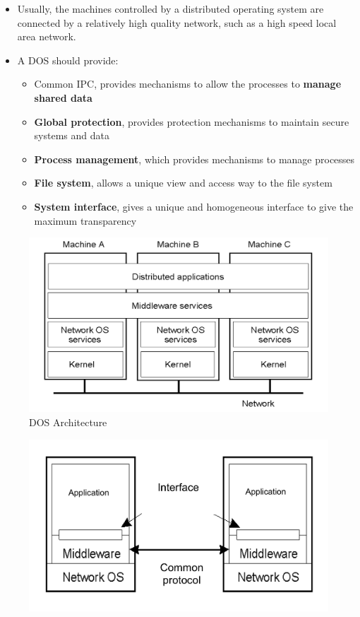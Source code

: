 \begin{itemize}
\begin{itemize}
        \item Usually, the machines controlled by a distributed operating system are connected by a relatively high quality network, such as a high speed local area network.
        \item A DOS should provide:
        \begin{itemize}
            \item Common IPC, provides mechanisms to allow the processes to \textbf{manage shared data}
            \item \textbf{Global protection}, provides protection mechanisms to maintain secure systems and data
            \item \textbf{Process management}, which provides mechanisms to manage processes
            \item \textbf{File system}, allows a unique view and access way to the file system
            \item \textbf{System interface}, gives a unique and homogeneous interface to give the maximum transparency
        \end{itemize}
    \end{itemize}
    \begin{figure}[!h]
            \centering
            \includegraphics[width=.6\linewidth]{images/distributedSystem/DOSArchitecture.jpeg}
            \caption{DOS Architecture}
    \end{figure}
    \begin{figure}[!htb]
       \begin{minipage}{0.48\textwidth}
         \centering
         \includegraphics[width=.7\linewidth]{images/distributedSystem/middleware1.jpeg}

\end{minipage}
\end{figure}
\end{itemize}
